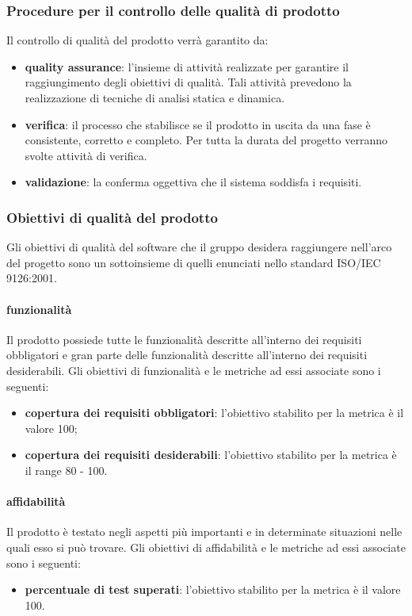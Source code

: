 		\subsubsection{Procedure per il controllo delle qualità di prodotto}
		Il controllo di qualità del prodotto verrà garantito da:
		\begin{itemize}
			\item \textbf{quality assurance}: l'insieme di attività realizzate per garantire il raggiungimento degli obiettivi di qualità. Tali attività prevedono la realizzazione di tecniche di analisi statica e dinamica.
			\item \textbf{verifica}: il processo che stabilisce se il prodotto in uscita da una fase è consistente, corretto e completo. Per tutta la durata del progetto verranno svolte attività di verifica.
			\item \textbf{validazione}: la conferma oggettiva che il sistema soddisfa i requisiti.
		\end{itemize}
		\subsubsection{Obiettivi di qualità del prodotto}
		Gli obiettivi di qualità del software che il gruppo \hx{} desidera raggiungere nell'arco del progetto sono un sottoinsieme di quelli enunciati nello standard ISO/IEC 9126:2001.
		
		 	\paragraph{funzionalità}
		 	Il prodotto possiede tutte le funzionalità descritte all'interno dei requisiti obbligatori e gran parte delle funzionalità descritte all'interno dei requisiti desiderabili.
		 	Gli obiettivi di funzionalità e le metriche ad essi associate sono i seguenti:
		 	\begin{itemize}
				\item \textbf{copertura dei requisiti obbligatori}: l'obiettivo stabilito per la metrica è il valore 100;
				\item \textbf{copertura dei requisiti desiderabili}: l'obiettivo stabilito per la metrica è il range 80 - 100.
			\end{itemize}
		 	\paragraph{affidabilità}
		 	Il prodotto è testato negli aspetti più importanti e in determinate situazioni nelle quali esso si può trovare.
		 	Gli obiettivi di affidabilità e le metriche ad essi associate sono i seguenti:
		 	\begin{itemize}
				\item \textbf{percentuale di test superati}: l'obiettivo stabilito per la metrica è il valore 100.
			\end{itemize}
